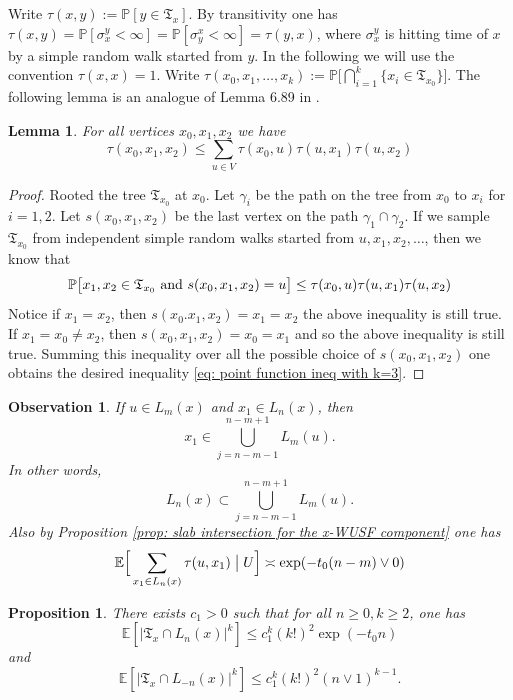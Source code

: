 \documentclass[12pt]{article}
\newtheorem{lemma}[theorem]{Lemma}
\newtheorem{proposition}[theorem]{Proposition}
\newtheorem{observation}[theorem]{Observation}
\numberwithin{equation}{section}
\newcommand{\be}{\begin{equation}}
\newcommand{\ee}{\end{equation}}
\newcommand{\1}{\mathbf{1}}
\begin{document}
 
 Write $\tau(x,y):=\mathbb{P}[y\in\mathfrak{T}_x]$. By transitivity one has $\tau(x,y)=\mathbb{P}[\sigma_x^y<\infty]=\mathbb{P}[\sigma_y^x<\infty]=\tau(y,x)$, where $\sigma_x^y$ is hitting time of $x$ by a simple random walk started from $y$. In the following we will use the convention $\tau(x,x)=1$. Write $\tau(x_0,x_1,\ldots,x_k):=\mathbb{P}\big[\bigcap_{i=1}^{k}\{x_i\in \mathfrak{T}_{x_0}\}\big]$. The following lemma is an analogue of Lemma 6.89 in \cite{Grimmett1999}. 
 \begin{lemma}\label{lem: point function ineq with k=3}
 	For all vertices $x_0,x_1,x_2$ we have 
 	\be\label{eq: point function ineq with k=3}
 	\tau(x_0,x_1,x_2)\leq \sum_{u\in V} \tau(x_0,u)\tau(u,x_1)\tau(u,x_2)
 	\ee
 \end{lemma}
 \begin{proof}
 	Rooted the tree $\mathfrak{T}_{x_0}$ at $x_0$. Let $\gamma_i$ be the path on the tree from $x_0$ to $x_i$ for $i=1,2$. Let $s(x_0,x_1,x_2)$ be the last vertex on the path $\gamma_1\cap \gamma_2$. If we sample $\mathfrak{T}_{x_0}$ from independent simple random walks started from $u,x_1,x_2,\ldots$, then we know that 
 	\be
 	\mathbb{P}\big[x_1,x_2\in\mathfrak{T}_{x_0}\textnormal{ and }s(x_0,x_1,x_2)=u \big]\leq
 	\tau(x_0,u)\tau(u,x_1)\tau(u,x_2)
 	\ee
 	Notice  if $x_1=x_2$, then $s(x_0.x_1,x_2)=x_1=x_2$ the above inequality is still true. If  $x_1=x_0\neq x_2$, then $s(x_0,x_1,x_2)=x_0=x_1$ and so the above inequality is still true. 
 	Summing this inequality over all the possible choice of $s(x_0,x_1,x_2)$ one obtains the desired inequality \eqref{eq: point function ineq with k=3}.
 \end{proof}
\begin{observation}\label{obse: relative level relation}
If $u\in L_m(x)$ and $x_1\in L_n(x)$, then \[
	x_1\in\bigcup_{j=n-m-1}^{n-m+1}L_m(u).
	\]
	In other words,
	\[
	L_n(x)\subset \bigcup_{j=n-m-1}^{n-m+1}L_m(u).
	\]
	Also by Proposition \ref{prop: slab intersection for the x-WUSF component} one has 
	\be\label{eq: relative expectation when x_1 runs over L_n(x)}
	\mathbb{E}\Big[\sum_{x_1\in L_n(x)}{\tau(u,x_1)}\bigm| U\Big]\asymp \exp(-t_0(n-m)\vee 0)
	\ee
\end{observation}
 \begin{proposition}\label{prop: high moments for x-component intersecting a slab}
 	There exists $c_{1}>0$ such that for all $n\geq0,k\geq 2$, one has 
 	\be\label{eq: second moment of x-component intersecting a high slab}
 	\mathbb{E}[|\mathfrak{T}_x\cap L_n(x)|^k]\leq c_{1}^k(k!)^{2}\exp(-t_0n)
 	\ee
 	and 
 	\be\label{eq: second moment of x-component intersecting a low slab}
 		\mathbb{E}[|\mathfrak{T}_x\cap L_{-n}(x)|^k]\leq c_{1}^k(k!)^{2} (n\vee 1)^{k-1}.
 	\ee
 \end{proposition}
\end{document}
